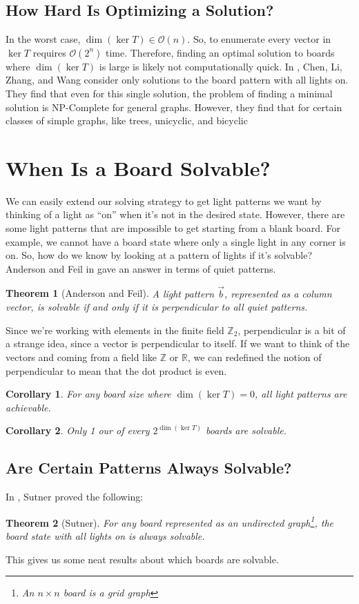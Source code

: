 \documentclass[a4paper]{article}
\renewcommand{\O}{\mathcal{O}}
\newcommand{\Z}{\mathbb{Z}}
\newcommand{\R}{\mathbb{R}}
\newtheorem*{theorem}{Theorem}
\newtheorem*{corollary}{Corollary}
\begin{document}
	\subsection{How Hard Is Optimizing a Solution?}
	In the worst case, $\dim{(\ker{T})} \in \O(n)$.
	So, to enumerate every vector in $\ker{T}$ requires $\O(2^n)$ time.
	Therefore, finding an optimal solution to boards where $\dim{(\ker{T})}$ is large is likely not computationally quick.
	In \cite{CHEN200493}, Chen, Li, Zhang, and Wang consider only solutions to the board pattern with all lights on.
	They find that even for this single solution, the problem of finding a minimal solution is NP-Complete for general graphs.
	However, they find that for certain classes of simple graphs, like trees, unicyclic, and bicyclic
	
	\section{When Is a Board Solvable?}
	We can easily extend our solving strategy to get light patterns we want by thinking of a light as ``on'' when it's not in the desired state.
	However, there are some light patterns that are impossible to get starting from a blank board.
	For example, we cannot have a board state where only a single light in any corner is on.
	So, how do we know by looking at a pattern of lights if it's solvable? \\
	
	Anderson and Feil in \cite{anderson_feil} gave an answer in terms of quiet patterns.
	\begin{theorem}[Anderson and Feil]
		A light pattern $\vec{b}$, represented as a column vector, is solvable if and only if it is perpendicular to all quiet patterns.
	\end{theorem}
	Since we're working with elements in the finite field $\Z_2$, perpendicular is a bit of a strange idea, since a vector is perpendicular to itself.
	If we want to think of the vectors and coming from a field like $\Z$ or $\R$, we can redefined the notion of perpendicular to mean that the dot product is even.
	\begin{corollary}
		For any board size where $\dim{(\ker{T})} = 0$, all light patterns are achievable.
	\end{corollary}
	\begin{corollary}
		Only 1 our of every $2^{\dim{(\ker{T})}}$ boards are solvable.
	\end{corollary}

	\subsection{Are Certain Patterns Always Solvable?}
	In \cite{Sutner1989}, Sutner proved the following:
	\begin{theorem}[Sutner]
		For any board represented as an undirected graph\footnote{An  $n \times n$ board is a grid graph}, the board state with all lights on is always solvable.
	\end{theorem}
	This gives us some neat results about which boards are solvable.
	
\end{document}

